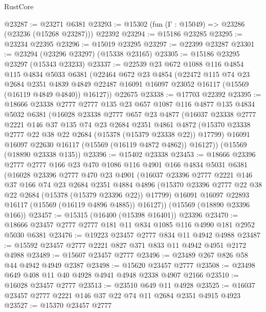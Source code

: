 \begin{lexlean}{RustCore}
\begin{coremodule}
@23287 := @23271 @6381
@23293 := @15302 (fun (Γ : @15049) => @23286 (@23236 (@15268 @23287))) @22392
@23294 := @15186 @23285
@23295 := @23234 @22395
@23296 := @15019 @23295
@23297 := @22399 @23287
@23301 := @23294 (@23296 @23297) (@15338 @23165)
@23305 := @15186 @23295 @23297 (@15343 @23233)
@23337 := @22539
    @23
    @672
    @1088
    @116
    @4854
    @115
    @4834
    @5033
    @6381
    (@22464
      @672
      @23
      @4854
      (@22472
        @115
        @74
        @23
        @2684
        @2351
        @4839
        @4849
        @22487
        @16091
        @16097
        @23052
        @16117
        (@15569 (@16119 @4849 @4840))
        @16127))
    @22675
@23338 := @17703 @22392
@23395 := @18666
    @23338
    @2777
    @2777
    @135
    @23
    @657
    @1087
    @116
    @4877
    @135
    @4834
    @5032
    @6381
    (@16028
      @23338
      @2777
      @657
      @23
      @4877
      (@16037
        @23338
        @2777
        @2221
        @146
        @37
        @135
        @74
        @23
        @2684
        @2351
        @4861
        @4872
        (@15370 @23338 @2777 @22 @38 @22 @2684 (@15378 (@15379 @23338 @22)) @17799)
        @16091
        @16097
        @22630
        @16117
        (@15569 (@16119 @4872 @4862))
        @16127))
    (@15569 (@18890 @23338 @135))
@23396 := @15402 @23338
@23453 := @18666
    @23396
    @2777
    @2777
    @166
    @23
    @470
    @1086
    @116
    @4901
    @166
    @4834
    @5031
    @6381
    (@16028
      @23396
      @2777
      @470
      @23
      @4901
      (@16037
        @23396
        @2777
        @2221
        @146
        @37
        @166
        @74
        @23
        @2684
        @2351
        @4884
        @4896
        (@15370 @23396 @2777 @22 @38 @22 @2684 (@15378 (@15379 @23396 @22)) @17799)
        @16091
        @16097
        @22893
        @16117
        (@15569 (@16119 @4896 @4885))
        @16127))
    (@15569 (@18890 @23396 @166))
@23457 := @15315 (@16400 (@15398 @16401)) @23396
@23470 := @18666 @23457 @2777 @2777 @181 @11 @834 @1085 @116 @4990 @181 @2952 @5030 @6381
@23476 := @19223 @23457 @2777 @834 @11 @4942 @4988
@23487 := @15592 @23457 @2777 @2221 @827 @371 @833 @11 @4942 @4951 @2172 @4988
@23489 := @15607 @23457 @2777
@23496 := @23489 @267 @826 @58 @44 @4942 @4949 @2387
@23498 := @15620 @23457 @2777
@23508 := @23498 @649 @408 @11 @40 @4928 @4941 @4948 @2338 @4907 @2166
@23510 := @16028 @23457 @2777
@23513 := @23510 @649 @11 @4928
@23525 := @16037 @23457 @2777 @2221 @146 @37 @22 @74 @11 @2684 @2351 @4915 @4923
@23527 := @15370 @23457 @2777

\end{coremodule}
\end{lexlean}
